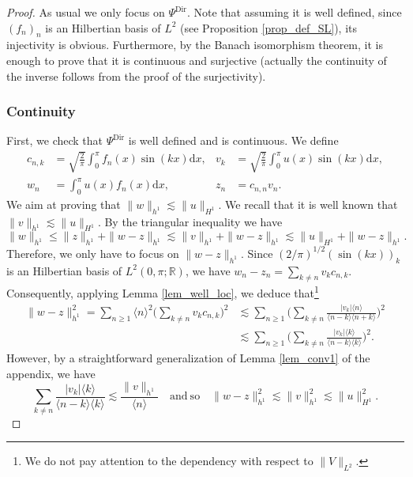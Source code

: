 \documentclass[JEP,XML,SOM,Unicode,NoEqCountersInSection,published]{cedram}
\theoremstyle{definition}
\begin{document}
\begin{proof} As usual we only focus on $\Psi^{\mathrm{Dir}}$. Note that assuming it is well defined, since $(f_n)_n$ is an Hilbertian basis of $L^2$ (see Proposition \ref{prop_def_SL}), its injectivity is obvious. Furthermore, by the Banach isomorphism theorem, it is enough to prove that it is continuous and surjective (\ie actually the continuity of the inverse follows from the proof of the surjectivity).

\subsubsection*{Continuity}
First, we check that $\Psi^{\mathrm{Dir}}$ is well defined and is continuous.
We define
\begin{equation}\label{eq_plein_de_monde}
\begin{aligned}
c_{n,k} &= \sqrt{\frac{2}\pi} \int_0^\pi f_n(x) \sin(k x) \mathrm{d}x, & v_k &= \sqrt{\frac{2}\pi} \int_0^\pi u(x) \sin(k x) \mathrm{d}x,\\
w_n &= \int_0^\pi u(x) f_n(x) \mathrm{d}x, & z_n &= c_{n,n} v_n.
\end{aligned}
\end{equation}
We aim at proving that $\| w\|_{h^1} \lesssim \| u \|_{H^1}$. We recall that it is well known that $\| v \|_{h^1} \lesssim \| u\|_{H^1}$. By the triangular inequality we have
\[
\| w\|_{h^1} \leq \| z \|_{h^1} + \|w - z \|_{h^1} \lesssim \| v \|_{h^1} + \|w - z \|_{h^1} \lesssim \| u \|_{H^1} + \|w - z \|_{h^1}.
\]
Therefore, we only have to focus on $\|w - z \|_{h^1}$. Since $(2/\pi)^{1/2}(\sin(kx))_k$ is an Hilbertian basis of $L^2(0,\pi;\mathbb{R})$, we have $
w_n - z_n = \sum_{k\neq n} v_k c_{n,k}$.
Consequently, applying Lemma \ref{lem_well_loc}, we deduce that\footnote{We do not pay attention to the dependency with respect to $\|V\|_{L^2}$.}
\begin{equation*}
\begin{split}
\|w - z \|_{h^1}^2 = \sum_{n\geq 1} \langle n \rangle^2 \biggl(\sum_{k\neq n} v_k c_{n,k} \biggr)^2 &\lesssim \sum_{n\geq 1} \biggl(\sum_{k\neq n} \frac{|v_k| \langle n \rangle}{\langle n-k \rangle \langle n+k \rangle } \biggr)^2 \\ &\lesssim \sum_{n\geq 1} \biggl(\sum_{k\neq n} \frac{|v_k| \langle k \rangle}{\langle n-k \rangle \langle k \rangle } \biggr)^2.
\end{split}
\end{equation*}
However, by a straightforward generalization of Lemma \ref{lem_conv1} of the appendix, we have
\[
\sum_{k\neq n} \frac{|v_k| \langle k \rangle}{\langle n-k \rangle \langle k \rangle } \lesssim \frac{\| v\|_{h^1}}{\langle n\rangle} \quad \mathrm{and } \ \mathrm{so} \quad \|w - z \|_{h^1}^2\lesssim \| v\|_{h^1}^2 \lesssim \|u\|_{H^1}^2.
\]


\end{proof}
\end{document}
